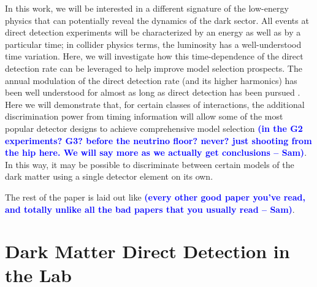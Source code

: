 \documentclass[11pt]{article}
\newcommand{\sam}[1]{\textcolor{blue}{\textbf{(#1 -- Sam)}}}
\begin{document}
In this work, we will be interested in a different signature of the low-energy physics that can potentially reveal the dynamics of the dark sector. All events at direct detection experiments will be characterized by an energy as well as by a particular time; in collider physics terms, the luminosity has a well-understood time variation. Here, we will investigate how this time-dependence of the direct detection rate can be leveraged to help improve model selection prospects. The annual modulation of the direct detection rate (and its higher harmonics) has been well understood for almost as long as direct detection has been pursued \cite{Freese:1987wu,Freese:2012xd,Lee:2013xxa,Lee:2013wza,DelNobile:2015tza,DelNobile:2015nua,DelNobile:2015rmp}. Here we will demonstrate that, for certain classes of interactions, the additional discrimination power from timing information will allow some of the most popular detector designs to achieve comprehensive model selection \sam{in the G2 experiments? G3? before the neutrino floor? never? just shooting from the hip here. We will say more as we actually get conclusions}. In this way, it may be possible to discriminate between certain models of the dark matter using a single detector element on its own.

The rest of the paper is laid out like \sam{every other good paper you've read, and totally unlike all the bad papers that you usually read}.

\section{Dark Matter Direct Detection in the Lab}
\end{document}
